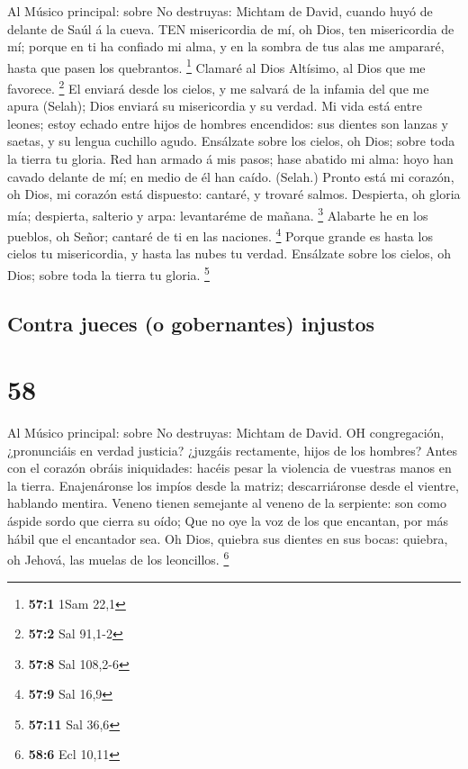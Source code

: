  Al Músico principal: sobre No destruyas: Michtam de David,
cuando huyó de delante de Saúl á la cueva. TEN misericordia de mí, oh
Dios, ten misericordia de mí; porque en ti ha confiado mi alma, y en la
sombra de tus alas me ampararé, hasta que pasen los quebrantos.
\footnote{\textbf{57:1} 1Sam 22,1}  Clamaré al Dios
Altísimo, al Dios que me favorece. \footnote{\textbf{57:2} Sal 91,1-2}
 El enviará desde los cielos, y me salvará de la infamia del
que me apura (Selah); Dios enviará su misericordia y su verdad.
 Mi vida está entre leones; estoy echado entre hijos de
hombres encendidos: sus dientes son lanzas y saetas, y su lengua
cuchillo agudo.  Ensálzate sobre los cielos, oh Dios; sobre
toda la tierra tu gloria.  Red han armado á mis pasos; hase
abatido mi alma: hoyo han cavado delante de mí; en medio de él han
caído. (Selah.)  Pronto está mi corazón, oh Dios, mi corazón
está dispuesto: cantaré, y trovaré salmos.  Despierta, oh
gloria mía; despierta, salterio y arpa: levantaréme de mañana.
\footnote{\textbf{57:8} Sal 108,2-6}  Alabarte he en los
pueblos, oh Señor; cantaré de ti en las naciones. \footnote{\textbf{57:9}
  Sal 16,9}  Porque grande es hasta los cielos tu
misericordia, y hasta las nubes tu verdad.  Ensálzate sobre
los cielos, oh Dios; sobre toda la tierra tu gloria. \footnote{\textbf{57:11}
  Sal 36,6}

\hypertarget{contra-jueces-o-gobernantes-injustos}{%
\subsection{Contra jueces (o gobernantes)
injustos}\label{contra-jueces-o-gobernantes-injustos}}

\hypertarget{section-57}{%
\section{58}\label{section-57}}

 Al Músico principal: sobre No destruyas: Michtam de David.
OH congregación, ¿pronunciáis en verdad justicia? ¿juzgáis rectamente,
hijos de los hombres?  Antes con el corazón obráis
iniquidades: hacéis pesar la violencia de vuestras manos en la tierra.
 Enajenáronse los impíos desde la matriz; descarriáronse
desde el vientre, hablando mentira.  Veneno tienen semejante
al veneno de la serpiente: son como áspide sordo que cierra su oído;
 Que no oye la voz de los que encantan, por más hábil que el
encantador sea.  Oh Dios, quiebra sus dientes en sus bocas:
quiebra, oh Jehová, las muelas de los leoncillos. \footnote{\textbf{58:6}
  Ecl 10,11}

